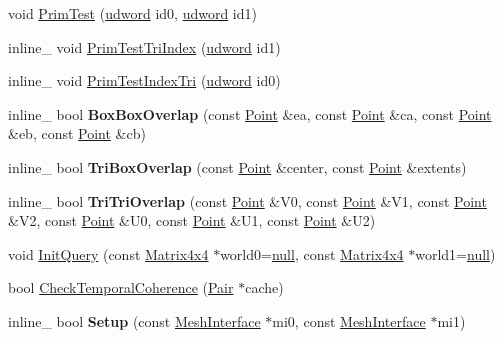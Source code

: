 \begin{DoxyCompactItemize}
\item 
void \hyperlink{classOpcode_1_1AABBTreeCollider_ac2dc406579fce4f35db3570f7fc2a0bf}{Prim\+Test} (\hyperlink{IceTypes_8h_a44c6f1920ba5551225fb534f9d1a1733}{udword} id0, \hyperlink{IceTypes_8h_a44c6f1920ba5551225fb534f9d1a1733}{udword} id1)
\item 
inline\+\_\+ void \hyperlink{classOpcode_1_1AABBTreeCollider_a0508888368cc7948330dc7e813c1451d}{Prim\+Test\+Tri\+Index} (\hyperlink{IceTypes_8h_a44c6f1920ba5551225fb534f9d1a1733}{udword} id1)
\item 
inline\+\_\+ void \hyperlink{classOpcode_1_1AABBTreeCollider_a33193f42d2b57c88e8a389ac4f997e1d}{Prim\+Test\+Index\+Tri} (\hyperlink{IceTypes_8h_a44c6f1920ba5551225fb534f9d1a1733}{udword} id0)
\item 
inline\+\_\+ bool {\bfseries Box\+Box\+Overlap} (const \hyperlink{classOpcode_1_1Point}{Point} \&ea, const \hyperlink{classOpcode_1_1Point}{Point} \&ca, const \hyperlink{classOpcode_1_1Point}{Point} \&eb, const \hyperlink{classOpcode_1_1Point}{Point} \&cb)\hypertarget{classOpcode_1_1AABBTreeCollider_afcb85460d850e1441f9e2ba831fedf63}{}\label{classOpcode_1_1AABBTreeCollider_afcb85460d850e1441f9e2ba831fedf63}

\item 
inline\+\_\+ bool {\bfseries Tri\+Box\+Overlap} (const \hyperlink{classOpcode_1_1Point}{Point} \&center, const \hyperlink{classOpcode_1_1Point}{Point} \&extents)\hypertarget{classOpcode_1_1AABBTreeCollider_a0e4e842e48126e24f5b79fceb08b5439}{}\label{classOpcode_1_1AABBTreeCollider_a0e4e842e48126e24f5b79fceb08b5439}

\item 
inline\+\_\+ bool {\bfseries Tri\+Tri\+Overlap} (const \hyperlink{classOpcode_1_1Point}{Point} \&V0, const \hyperlink{classOpcode_1_1Point}{Point} \&V1, const \hyperlink{classOpcode_1_1Point}{Point} \&V2, const \hyperlink{classOpcode_1_1Point}{Point} \&U0, const \hyperlink{classOpcode_1_1Point}{Point} \&U1, const \hyperlink{classOpcode_1_1Point}{Point} \&U2)\hypertarget{classOpcode_1_1AABBTreeCollider_a037086eb9a54bd9815526c9d694f7642}{}\label{classOpcode_1_1AABBTreeCollider_a037086eb9a54bd9815526c9d694f7642}

\item 
void \hyperlink{classOpcode_1_1AABBTreeCollider_a80deda4fb16093f2f8ad802685edfbdf}{Init\+Query} (const \hyperlink{classOpcode_1_1Matrix4x4}{Matrix4x4} $\ast$world0=\hyperlink{IceTypes_8h_ac97b8ee753e4405397a42ad5799b0f9e}{null}, const \hyperlink{classOpcode_1_1Matrix4x4}{Matrix4x4} $\ast$world1=\hyperlink{IceTypes_8h_ac97b8ee753e4405397a42ad5799b0f9e}{null})
\item 
bool \hyperlink{classOpcode_1_1AABBTreeCollider_ad153e4171d8202dbc0ae7c68d3a94a5d}{Check\+Temporal\+Coherence} (\hyperlink{structPair}{Pair} $\ast$cache)
\item 
inline\+\_\+ bool {\bfseries Setup} (const \hyperlink{classOpcode_1_1MeshInterface}{Mesh\+Interface} $\ast$mi0, const \hyperlink{classOpcode_1_1MeshInterface}{Mesh\+Interface} $\ast$mi1)\hypertarget{classOpcode_1_1AABBTreeCollider_af16e950c81e8ba2e0431243e2796eca4}{}\label{classOpcode_1_1AABBTreeCollider_af16e950c81e8ba2e0431243e2796eca4}

\end{DoxyCompactItemize}

